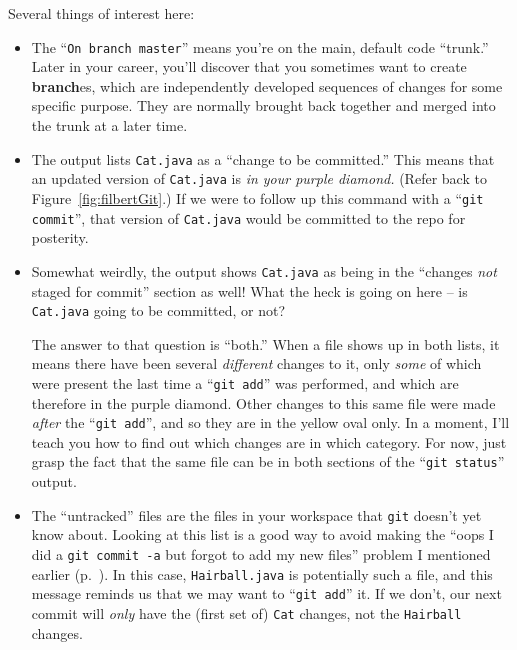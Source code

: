 \pagebreak
Several things of interest here:

\begin{itemize}

\item The ``\texttt{On branch master}'' means you're on the main, default code
``trunk.'' Later in your career, you'll discover that you sometimes want to
create \textbf{branch}es, which are independently developed sequences of
changes for some specific purpose. They are normally brought back together and
merged into the trunk at a later time.

\item The output lists \texttt{Cat.java} as a ``change to be committed.'' This
means that an updated version of \texttt{Cat.java} is \textit{in your purple
diamond.} (Refer back to Figure~\ref{fig:filbertGit}.) If we were to follow up
this command with a ``\texttt{git commit}'', that version of \texttt{Cat.java}
would be committed to the repo for posterity.

\item Somewhat weirdly, the output shows \texttt{Cat.java} as being in the
``changes \textit{not} staged for commit'' section as well! What the heck is
going on here -- is \texttt{Cat.java} going to be committed, or not?

The answer to that question is ``both.'' When a file shows up in both lists,
it means there have been several \textit{different} changes to it, only
\textit{some} of which were present the last time a ``\texttt{git add}'' was
performed, and which are therefore in the purple diamond. Other changes to this
same file were made \textit{after} the ``\texttt{git add}'', and so they are
in the yellow oval only. In a moment, I'll teach you how to find out which
changes are in which category. For now, just grasp the fact that the same file
can be in both sections of the ``\texttt{git status}'' output.

\item The ``untracked'' files are the files in your workspace that
\texttt{git} doesn't yet know about. Looking at this list is a good way to
avoid making the ``oops I did a \texttt{git commit -a} but forgot to add my
new files'' problem I mentioned earlier (p.~\pageref{commitPitfall}). In this
case, \texttt{Hairball.java} is potentially such a file, and this message
reminds us that we may want to ``\texttt{git add}'' it. If we don't, our next
commit will \textit{only} have the (first set of) \texttt{Cat} changes, not
the \texttt{Hairball} changes.


\end{itemize}
